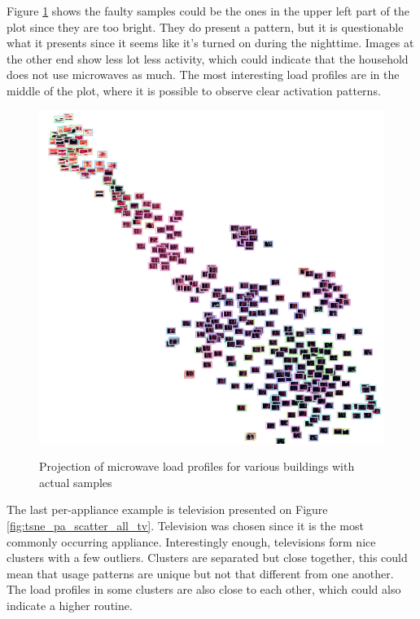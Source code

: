 Figure \ref{fig:tsne_pa_img_scatter_all_microwave} shows the faulty samples could be the ones in the upper left part of the plot since they are too bright.
They do present a pattern, but it is questionable what it presents since it seems like it's turned on during the nighttime. 
Images at the other end show less lot less activity, which could indicate that
the household does not use microwaves as much. The most interesting load profiles are in the middle of the 
plot, where it is possible to observe clear activation patterns. 

\begin{figure}[H]
	\centering
	\caption{Projection of microwave load profiles for various buildings with actual samples}
	\includegraphics[width=.9\textwidth]{Figures/TSNE/TSNE_per_appliance/all/img_scatter_allmicrowave.png}
	\label{fig:tsne_pa_img_scatter_all_microwave}
\end{figure}

The last per-appliance example is television presented on Figure \ref{fig:tsne_pa_scatter_all_tv}. 
Television was chosen since it is the most commonly occurring appliance.
Interestingly enough, televisions form nice clusters with a few outliers.
Clusters are separated but close together, this could mean that usage patterns are unique
but not that different from one another. 
The load profiles in some clusters are also close to each other, which could also indicate 
a higher routine.

